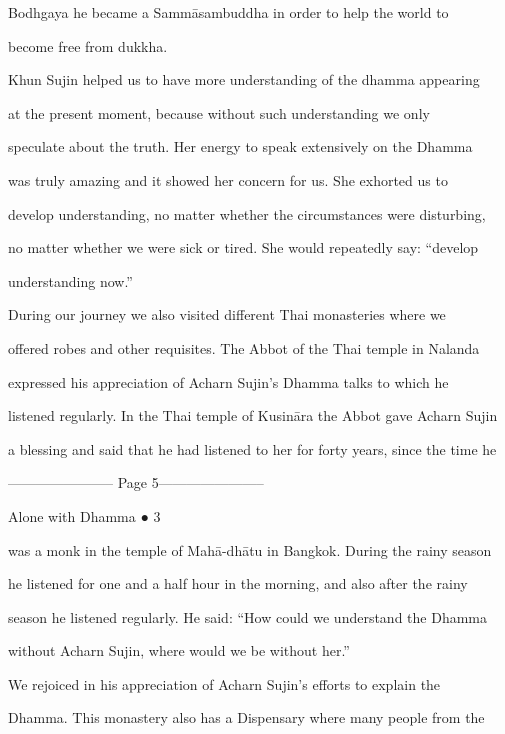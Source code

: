 Bodhgaya   he   became   a   Sammāsambuddha   in   order   to   help   the   world   to  

become free from dukkha. 



Khun  Sujin helped us to have more understanding of the dhamma appearing  

at   the   present   moment,   because   without   such   understanding   we   only  

speculate  about  the  truth.  Her  energy  to  speak  extensively  on  the  Dhamma  

was   truly   amazing  and   it  showed  her   concern  for  us.   She  exhorted  us  to  

develop understanding, no matter whether the circumstances were disturbing,  

no matter whether we were sick or tired. She would repeatedly say: “develop  

understanding now.”  

   During  our journey   we  also  visited   different  Thai  monasteries  where   we  

offered robes  and other requisites. The Abbot of the Thai temple  in Nalanda  

expressed   his   appreciation   of   Acharn   Sujin’s   Dhamma   talks   to   which   he  

listened regularly. In the Thai temple of Kusināra the Abbot gave Acharn Sujin  

a blessing and said that he had listened to her for forty years, since the time he  


----------------------- Page 5-----------------------

                                                                   Alone with Dhamma ● 3 



was a monk in the temple of Mahā-dhātu in Bangkok. During the rainy season  

he  listened for  one  and  a half hour  in the morning,  and  also  after the  rainy  

season he listened regularly. He said: “How could we understand the Dhamma  

without Acharn Sujin, where would we be without her.” 

   We   rejoiced   in   his   appreciation   of   Acharn   Sujin’s   efforts   to   explain   the  

Dhamma. This monastery also has a Dispensary where many people from the  

